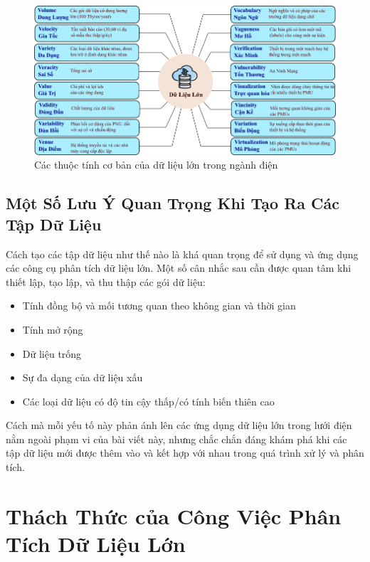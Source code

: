 \documentclass[utf8]{frontiersSCNS} %
\begin{document}
\begin{figure}[h!]
\centering
	\begin{center}
		\includegraphics[width=\textwidth]{big-data-properties-VN}%
	\end{center}
	\caption{Các thuộc tính cơ bản của dữ liệu lớn trong ngành điện}\label{fig:1}
\end{figure}


\subsection{Một Số Lưu Ý Quan Trọng Khi Tạo Ra Các Tập Dữ Liệu}

Cách tạo các tập dữ liệu như thế nào là khá quan trọng để sử dụng và ứng dụng các công cụ phân tích dữ liệu lớn. Một số cân nhắc sau cần được quan tâm khi thiết lập, tạo lập, và thu thập các gói dữ liệu: 

\begin{itemize}
\item Tính đồng bộ và mối tương quan theo không gian và thời gian
\item Tính mở rộng
\item Dữ liệu trống
\item Sự đa dạng của dữ liệu xấu
\item Các loại dữ liệu có độ tin cậy thấp/có tính biến thiên cao
\end{itemize}

Cách mà mỗi yếu tố này phản ánh lên các ứng dụng dữ liệu lớn trong lưới điện nằm ngoài phạm vi của bài viết này, nhưng chắc chắn đáng khám phá khi các tập dữ liệu mới được thêm vào và kết hợp với nhau trong quá trình xử lý và phân tích.

\section{Thách Thức của Công Việc Phân Tích Dữ Liệu Lớn}
\end{document}
